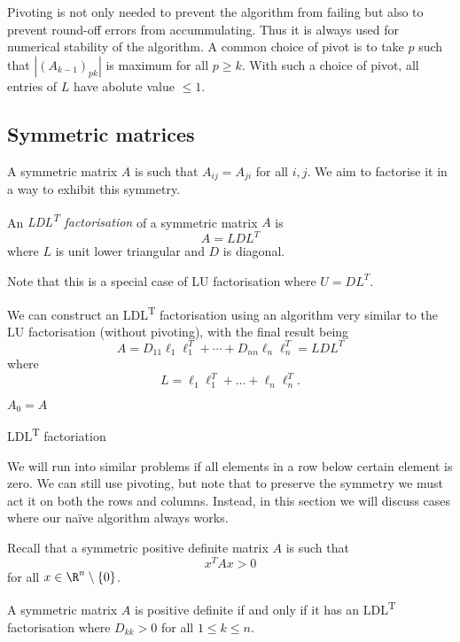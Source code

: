 \documentclass[a4paper]{article}
\begin{document}
Pivoting is not only needed to prevent the algorithm from failing but also to prevent round-off errors from accummulating. Thus it is always used for numerical stability of the algorithm. A common choice of pivot is to take \(p\) such that \(|(A_{k - 1})_{pk}|\) is maximum for all \(p \geq k\). With such a choice of pivot, all entries of \(L\) have abolute value \(\leq 1\).

\subsection{Symmetric matrices}

A symmetric matrix \(A\) is such that \(A_{ij} = A_{ji}\) for all \(i, j\). We aim to factorise it in a way to exhibit this symmetry. 

\begin{definition}
  An \emph{LDL\textsuperscript{T} factorisation} of a symmetric matrix \(A\) is
  \[
    A = LDL^T
  \]
  where \(L\) is unit lower triangular and \(D\) is diagonal.
\end{definition}

Note that this is a special case of LU factorisation where \(U = DL^T\).

We can construct an LDL\textsuperscript{T} factorisation using an algorithm very similar to the LU factorisation (without pivoting), with the final result being
\[
  A = D_{11}\ell_1\ell_1^T + \cdots + D_{nn}\ell_n\ell_n^T = LDL^T
\]
where
\[
  L = \ell_1\ell_1^T + \dots + \ell_n\ell_n^T.
\]

\begin{algorithm}
  \(A_0 = A\)\;
  \caption{LDL\textsuperscript{T} factoriation}
\end{algorithm}

We will run into similar problems if all elements in a row below certain element is zero. We can still use pivoting, but note that to preserve the symmetry we must act it on both the rows and columns. Instead, in this section we will discuss cases where our naïve algorithm always works.

Recall that a symmetric positive definite matrix \(A\) is such that
\[
  x^TAx > 0
\]
for all \(x \in \R^n \setminus \{0\}\).

\begin{theorem}
  A symmetric matrix \(A\) is positive definite if and only if it has an LDL\textsuperscript{T} factorisation where \(D_{kk} > 0\) for all \(1 \leq k \leq n\).
\end{theorem}
\end{document}
